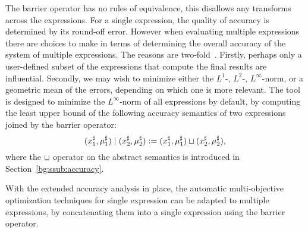 The barrier operator has no rules of equivalence, this disallows any
transforms across the expressions.  For a single expression, the quality
of accuracy is determined by its round-off error.  However when evaluating
multiple expressions there are choices to make in terms of determining the
overall accuracy of the system of multiple expressions.  The reasons are
two-fold~\cite{martel09}.  Firstly, perhaps only a user-defined subset of the
expressions that compute the final results are influential.  Secondly, we may
wish to minimize either the $L^1$-, $L^2$-, $L^\infty$-norm, or a geometric
mean of the errors, depending on which one is more relevant.  The tool is
designed to minimize the $L^\infty$-norm of all expressions by default, by
computing the least upper bound of the following accuracy semantics of two
expressions joined by the barrier operator:
\begin{equation}
    (x^\sharp_1, \mu^\sharp_1) \mid (x^\sharp_2, \mu^\sharp_2)
    \vcentcolon= (x^\sharp_1, \mu^\sharp_1) \sqcup (x^\sharp_2, \mu^\sharp_2),
\end{equation}
where the $\sqcup$ operator on the abstract semantics is introduced in
Section~\ref{bg:ssub:accuracy}.

With the extended accuracy analysis in place, the automatic multi-objective
optimization techniques for single expression can be adapted to multiple
expressions, by concatenating them into a single expression using the barrier
operator.
